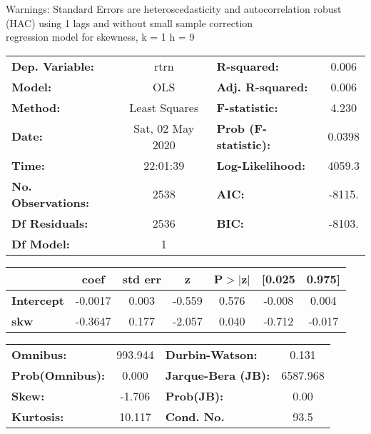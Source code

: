 Warnings: \newline
 [1] Standard Errors are heteroscedasticity and autocorrelation robust (HAC) using 1 lags and without small sample correction\\ 

regression model for skewness, k = 1 h = 9\begin{center}
\begin{tabular}{lclc}
\toprule
\textbf{Dep. Variable:}    &       rtrn       & \textbf{  R-squared:         } &     0.006   \\
\textbf{Model:}            &       OLS        & \textbf{  Adj. R-squared:    } &     0.006   \\
\textbf{Method:}           &  Least Squares   & \textbf{  F-statistic:       } &     4.230   \\
\textbf{Date:}             & Sat, 02 May 2020 & \textbf{  Prob (F-statistic):} &   0.0398    \\
\textbf{Time:}             &     22:01:39     & \textbf{  Log-Likelihood:    } &    4059.3   \\
\textbf{No. Observations:} &        2538      & \textbf{  AIC:               } &    -8115.   \\
\textbf{Df Residuals:}     &        2536      & \textbf{  BIC:               } &    -8103.   \\
\textbf{Df Model:}         &           1      & \textbf{                     } &             \\
\bottomrule
\end{tabular}
\begin{tabular}{lcccccc}
                   & \textbf{coef} & \textbf{std err} & \textbf{z} & \textbf{P$> |$z$|$} & \textbf{[0.025} & \textbf{0.975]}  \\
\midrule
\textbf{Intercept} &      -0.0017  &        0.003     &    -0.559  &         0.576        &       -0.008    &        0.004     \\
\textbf{skw}       &      -0.3647  &        0.177     &    -2.057  &         0.040        &       -0.712    &       -0.017     \\
\bottomrule
\end{tabular}
\begin{tabular}{lclc}
\textbf{Omnibus:}       & 993.944 & \textbf{  Durbin-Watson:     } &    0.131  \\
\textbf{Prob(Omnibus):} &   0.000 & \textbf{  Jarque-Bera (JB):  } & 6587.968  \\
\textbf{Skew:}          &  -1.706 & \textbf{  Prob(JB):          } &     0.00  \\
\textbf{Kurtosis:}      &  10.117 & \textbf{  Cond. No.          } &     93.5  \\
\bottomrule
\end{tabular}
\end{center}

